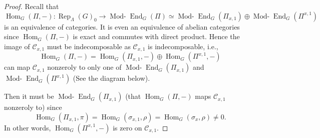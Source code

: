 \documentclass{article}
\newcommand{\Hom}{\operatorname{Hom}}
\newcommand{\Rep}{\operatorname{Rep}}
\newcommand{\End}{\operatorname{End}}
\newcommand{\Modr}{\operatorname{Mod-}}
\begin{document}
	\begin{proof}
		Recall that 
		$$\Hom_G(\Pi, -): \Rep_{\Lambda}(G)_0 \to \Modr\End_G(\Pi) \simeq \Modr\End_G(\Pi_{x,1}) \oplus \Modr\End_G(\Pi^{x,1})$$ 
		is an equivalence of categories. It is even an equivalence of abelian categories since $\Hom_G(\Pi, -)$ is exact and commutes with direct product. Hence the image of $\mathcal{C}_{x,1}$ must be indecomposable as $\mathcal{C}_{x,1}$ is indecomposable, i.e., 
		$$\Hom_G(\Pi, -)=\Hom_G(\Pi_{x,1}, -) \oplus \Hom_G(\Pi^{x,1}, -)$$
		can map $\mathcal{C}_{x,1}$ nonzeroly to only one of $\Modr\End_G(\Pi_{x,1})$ and $\Modr\End_G(\Pi^{x,1})$ (See the diagram below). 
		
		
		Then it must be $\Modr\End_G(\Pi_{x,1})$ (that $\Hom_G(\Pi, -)$ maps $\mathcal{C}_{x,1}$ nonzeroly to) since 
		$$\Hom_G(\Pi_{x,1}, \pi)=\Hom_G(\sigma_{x,1}, \rho)=\Hom_G(\sigma_x, \rho) \neq 0.$$
		In other words, $\Hom_G(\Pi^{x,1}, -)$ is zero on $\mathcal{C}_{x,1}$.
		
	\end{proof}
	
	
\end{document}
